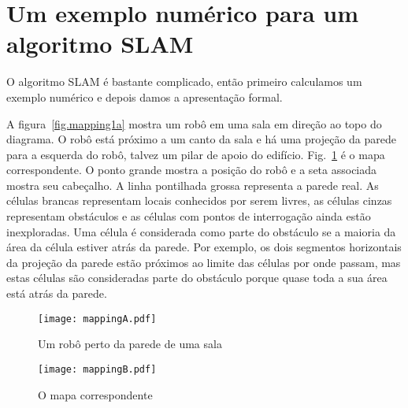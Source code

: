 \section{Um exemplo numérico para um algoritmo SLAM}\label{s.slam-numerical}

O algoritmo SLAM é bastante complicado, então primeiro calculamos um exemplo numérico e depois damos a apresentação formal.

A figura~\ref{fig.mapping1a} mostra um robô em uma sala em direção ao topo do diagrama. O robô está próximo a um canto da sala e há uma projeção da parede para a esquerda do robô, talvez um pilar de apoio do edifício. Fig.~\ref{fig.mapping1b} é o mapa correspondente. O ponto grande mostra a posição do robô e a seta associada mostra seu cabeçalho. A linha pontilhada grossa representa a parede real. As células brancas representam locais conhecidos por serem livres, as células cinzas representam obstáculos e as células com pontos de interrogação ainda estão inexploradas. Uma célula é considerada como parte do obstáculo se a maioria da área da célula estiver atrás da parede. Por exemplo, os dois segmentos horizontais da projeção da parede estão próximos ao limite das células por onde passam, mas estas células são consideradas parte do obstáculo porque quase toda a sua área está atrás da parede.

\begin{figure}
\begin{minipage}{.45\textwidth}
\texttt{[image: mappingA.pdf]}
\caption{Um robô perto da parede de uma sala}
\label{fig.mapping1a}
\end{minipage}
\hspace{\fill}
\begin{minipage}{.45\textwidth}
\texttt{[image: mappingB.pdf]}
\caption{O mapa correspondente}
\label{fig.mapping1b}
\end{minipage}
\end{figure}

%

